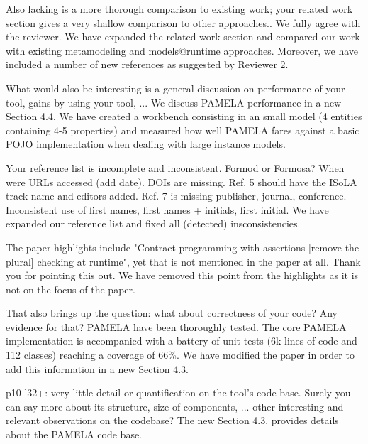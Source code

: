 \documentclass[10pt]{article}
\begin{document}
\begin{response}{Also lacking is a more thorough comparison to existing work; your related work section gives a very shallow comparison to other approaches..}
We fully agree with the reviewer. We have expanded the related work section and compared our work with existing metamodeling and models@runtime approaches. Moreover, we have included a number of new references as suggested by Reviewer 2.
\end{response}

\begin{response}{What would also be interesting is a general discussion on performance of your tool, gains by using your tool, ...
} We discuss PAMELA performance in a new Section 4.4. We have created a workbench consisting in an small model (4 entities containing 4-5 properties) and measured how well PAMELA fares against a basic POJO implementation when dealing with large instance models.
\end{response}

\begin{response}{Your reference list is incomplete and inconsistent. Formod or Formosa? When were URLs accessed (add date). DOIs are missing. Ref. 5 should have the ISoLA track name and editors added. Ref. 7 is missing publisher, journal, conference. Inconsistent use of first names, first names + initials, first initial.}
We have expanded our reference list and fixed all (detected) insconsistencies.
\end{response}

\begin{response}{The paper highlights include "Contract programming with assertions [remove the plural] checking at runtime", yet that is not mentioned in the paper at all.
} Thank you for pointing this out. We have removed this point from the highlights as it is not on the focus of the paper.
\end{response}

\begin{response}{That also brings up the question: what about correctness of your code? Any evidence for that?}
PAMELA have been thoroughly tested. The core PAMELA implementation is accompanied with a battery of unit tests (6k lines of code and 112 classes) reaching a coverage of 66\%. We have modified the paper in order to add this information in a new Section 4.3.
\end{response}

\begin{response}{p10 l32+: very little detail or quantification on the tool's code base. Surely you can say more about its structure, size of components, ... other interesting and relevant observations on the codebase?}
The new Section 4.3. provides details about the PAMELA code base.
\end{response}
\end{document}
